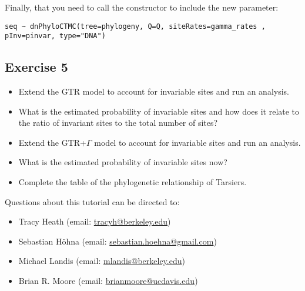 Finally, that you need to call the  constructor to include the new parameter:
{\tt \begin{snugshade*}
\begin{lstlisting}
seq ~ dnPhyloCTMC(tree=phylogeny, Q=Q, siteRates=gamma_rates , pInv=pinvar, type="DNA")
\end{lstlisting}
\end{snugshade*}}

\subsection{Exercise 5}

\begin{itemize}
\item Extend the GTR model to account for invariable sites and run an analysis.
\item What is the estimated probability of invariable sites and how does it relate to the ratio of invariant sites to the total number of sites?
\item Extend the GTR+$\Gamma$ model to account for invariable sites and run an analysis.
\item What is the estimated probability of invariable sites now?
\item Complete the table of the phylogenetic relationship of Tarsiers.
\end{itemize} 

\vspace{5cm}
Questions about this tutorial can be directed to: \\\vspace{-10mm}
\begin{itemize}
\item Tracy Heath (email: \href{mailto:tracyh@berkeley.edu}{tracyh@berkeley.edu}) \\\vspace{-8mm}
\item Sebastian H\"{o}hna (email: \href{mailto:sebastian.hoehna@gmail.com}{sebastian.hoehna@gmail.com}) \\\vspace{-8mm}
\item Michael Landis (email: \href{mailto:mlandis@berkeley.edu}{mlandis@berkeley.edu}) \\\vspace{-8mm} 
\item Brian R. Moore (email: \href{mailto:brianmoore@ucdavis.edu}{brianmoore@ucdavis.edu}) \\\vspace{-8mm}
\end{itemize}



